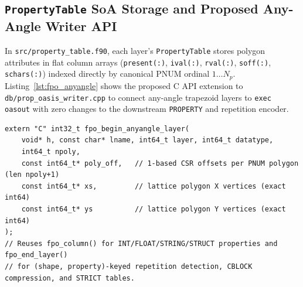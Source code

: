 \subsection{\texttt{PropertyTable} SoA Storage and Proposed Any-Angle Writer API}

In \texttt{src/property\_table.f90}, each layer's \texttt{PropertyTable} stores polygon attributes in flat column arrays (\texttt{present(:)}, \texttt{ival(:)}, \texttt{rval(:)}, \texttt{soff(:)}, \texttt{schars(:)}) indexed directly by canonical PNUM ordinal $1 \dots N_p$. Listing~\ref{lst:fpo_anyangle} shows the proposed C API extension to \texttt{db/prop\_oasis\_writer.cpp} to connect any-angle trapezoid layers to \texttt{exec oasout} with zero changes to the downstream \texttt{PROPERTY} and repetition encoder.

\begin{lstlisting}[style=cppstyle,caption={Proposed \texttt{fpo\_begin\_anyangle\_layer} C API bridging \texttt{ldb\_trapset\_polys} to \texttt{db/prop\_oasis\_writer.cpp}.},label={lst:fpo_anyangle}]
extern "C" int32_t fpo_begin_anyangle_layer(
    void* h, const char* lname, int64_t layer, int64_t datatype,
    int64_t npoly,
    const int64_t* poly_off,   // 1-based CSR offsets per PNUM polygon (len npoly+1)
    const int64_t* xs,         // lattice polygon X vertices (exact int64)
    const int64_t* ys          // lattice polygon Y vertices (exact int64)
);
// Reuses fpo_column() for INT/FLOAT/STRING/STRUCT properties and fpo_end_layer()
// for (shape, property)-keyed repetition detection, CBLOCK compression, and STRICT tables.
\end{lstlisting}

